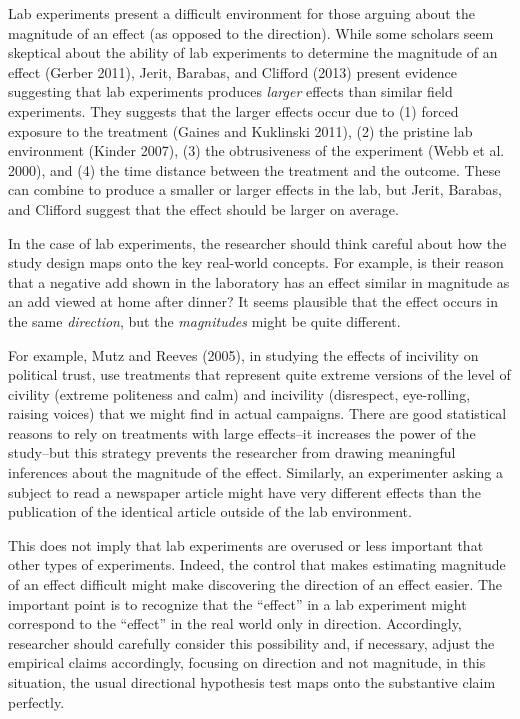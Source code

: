 \documentclass[12pt]{article}
\begin{document}

Lab experiments present a difficult environment for those arguing about the magnitude of an effect (as opposed to the direction). While some scholars seem skeptical about the ability of lab experiments to determine the magnitude of an effect (Gerber 2011), Jerit, Barabas, and Clifford (2013) present evidence suggesting that lab experiments produces \textit{larger} effects than similar field experiments. They suggests that the larger effects occur due to (1) forced exposure to the treatment (Gaines and Kuklinski 2011), (2) the pristine lab environment (Kinder 2007), (3) the obtrusiveness of the experiment (Webb et al. 2000), and (4) the time distance between the treatment and the outcome. These can combine to produce a smaller or larger effects in the lab, but Jerit, Barabas, and Clifford suggest that the effect should be larger on average.

In the case of lab experiments, the researcher should think careful about how the study design maps onto the key real-world concepts. For example, is their reason that a negative add shown in the laboratory has an effect similar in magnitude as an add viewed at home after dinner? It seems plausible that the effect occurs in the same \emph{direction}, but the \emph{magnitudes} might be quite different.

For example, Mutz and Reeves (2005), in studying the effects of incivility on political trust, use treatments that represent quite extreme versions of the level of civility (extreme politeness and calm) and incivility (disrespect, eye-rolling, raising voices) that we might find in actual campaigns. There are good statistical reasons to rely on treatments with large effects--it increases the power of the study--but this strategy prevents the researcher from drawing meaningful inferences about the magnitude of the effect. Similarly, an experimenter asking a subject to read a newspaper article might have very different effects than the publication of the identical article outside of the lab environment.

This does not imply that lab experiments are overused or less important that other types of experiments. Indeed, the control that makes estimating magnitude of an effect difficult might make discovering the direction of an effect easier. The important point is to recognize that the ``effect'' in a lab experiment might correspond to the ``effect'' in the real world only in direction. Accordingly, researcher should carefully consider this possibility and, if necessary, adjust the empirical claims accordingly, focusing on direction and not magnitude, in this situation, the usual directional hypothesis test maps onto the substantive claim perfectly.
\end{document}
